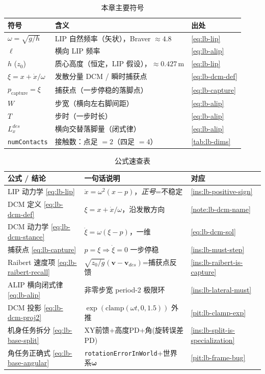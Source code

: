 \begin{table}[H]\centering\small
\caption{本章主要符号}
\begin{tabular}{lll}
\toprule
符号 & 含义 & 出处 \\
\midrule
$\omega=\sqrt{g/h}$ & LIP 自然频率（矢状），Braver $\approx 4.8$ & \cref{eq:lb-lip} \\
$\ell$ & 横向 LIP 频率 & \cref{eq:lb-alip} \\
$h$ ($z_0$) & 质心高度（恒定，LIP 假设），$\approx 0.427\,\mathrm{m}$ & \cref{eq:lb-lip} \\
$\xi=x+\dot x/\omega$ & 发散分量 DCM / 瞬时捕获点 & \cref{eq:lb-dcm-def} \\
$p_{\mathrm{capture}}=\xi$ & 捕获点（一步停稳的落脚点） & \cref{eq:lb-capture} \\
$W$ & 步宽（横向左右脚间距） & \cref{eq:lb-alip} \\
$T$ & 步时（一步时长） & \cref{eq:lb-alip} \\
$L_x^{des}$ & 横向交替落脚量（闭式律） & \cref{eq:lb-alip} \\
\texttt{numContacts} & 接触数：点足 $=2$（四足 $=4$） & \cref{tab:lb-dims} \\
\bottomrule
\end{tabular}
\end{table}

\begin{table}[H]\centering\small
\caption{公式速查表}
\begin{tabular}{lll}
\toprule
公式 / 结论 & 一句话说明 & 对应 \\
\midrule
LIP 动力学 \cref{eq:lb-lip} & $\ddot x=\omega^2(x-p)$，\emph{正号}=不稳定 & \cref{ins:lb-positive-sign} \\
DCM 定义 \cref{eq:lb-dcm-def} & $\xi=x+\dot x/\omega$，沿发散方向 & \cref{note:lb-dcm-name} \\
DCM 动力学 \cref{eq:lb-dcm-stance} & $\dot\xi=\omega(\xi-p)$，一维 & \cref{eq:lb-dcm-sol} \\
捕获点 \cref{eq:lb-capture} & $p=\xi\Rightarrow\dot\xi=0$ 一步停稳 & \cref{ins:lb-must-step} \\
Raibert 速度项 \cref{eq:lb-raibert-recall} & $\sqrt{z_0/g}(\mathbf v-\mathbf v_{des})$=捕获点反馈 & \cref{ins:lb-raibert-is-capture} \\
ALIP 横向闭式律 \cref{eq:lb-alip} & 非零步宽 period-2 极限环 & \cref{ins:lb-lateral-must} \\
DCM 投影 \cref{eq:lb-dcm-proj2} & $\exp(\mathrm{clamp}(\omega t,0,1.5))$ 外推 & \cref{pit:lb-clamp-exp} \\
机身任务拆分 \cref{eq:lb-base-split} & XY前馈+高度PD+角(旋转误差PD) & \cref{ins:lb-split-is-specialization} \\
角任务正确式 \cref{eq:lb-base-angular} & \texttt{rotationErrorInWorld}+世界系$\boldsymbol\omega$ & \cref{pit:lb-frame-bug} \\
\bottomrule
\end{tabular}
\end{table}

